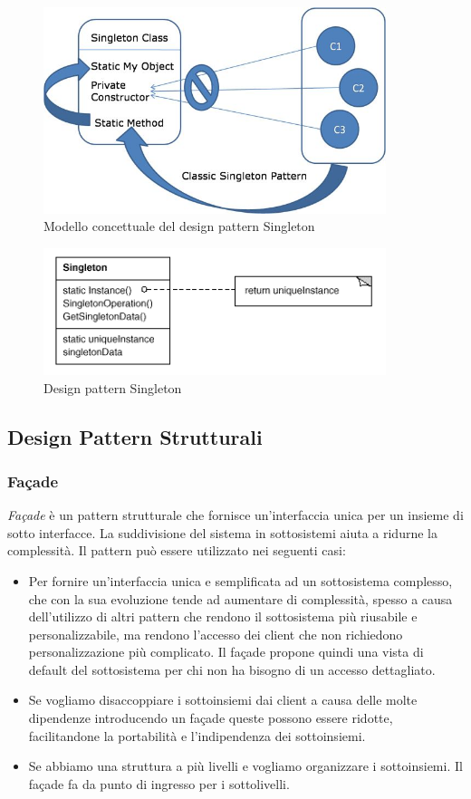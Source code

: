 \begin{figure}
	\centering
	\includegraphics[width=10cm]{diagrammi_img/singleton.jpg}
	\caption{Modello concettuale del design pattern Singleton}
\end{figure}

\begin{figure}
	\centering
	\includegraphics[width=10cm]{diagrammi_img/singleton_class.png}
	\caption{Design pattern Singleton}
\end{figure}

\subsection{Design Pattern Strutturali}

\subsubsection{Fa\c{c}ade}
\textit{Fa\c{c}ade} è un pattern strutturale che fornisce un'interfaccia unica per un insieme di sotto interfacce. La suddivisione del sistema in sottosistemi aiuta a ridurne la complessità.
Il pattern può essere utilizzato nei seguenti casi:
\begin{itemize}
	\item Per fornire un'interfaccia unica e semplificata ad un sottosistema complesso, che con la sua evoluzione tende ad aumentare di complessità, spesso a causa dell'utilizzo di altri pattern che rendono il sottosistema più riusabile e personalizzabile, ma rendono l'accesso dei client che non richiedono personalizzazione più complicato. Il fa\c{c}ade propone quindi una vista di default del sottosistema per chi non ha bisogno di un accesso dettagliato.
	\item Se vogliamo disaccoppiare i sottoinsiemi dai client a causa delle molte dipendenze introducendo un fa\c{c}ade queste possono essere ridotte, facilitandone la portabilità e l'indipendenza dei sottoinsiemi.
	\item Se abbiamo una struttura a più livelli e vogliamo organizzare i sottoinsiemi. Il fa\c{c}ade fa da punto di ingresso per i sottolivelli.
\end{itemize}

